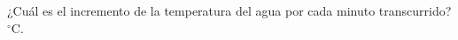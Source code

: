 ¿Cuál es el incremento de la temperatura del agua por cada minuto transcurrido? \fillin[4][0.5cm] $^\circ$C.
